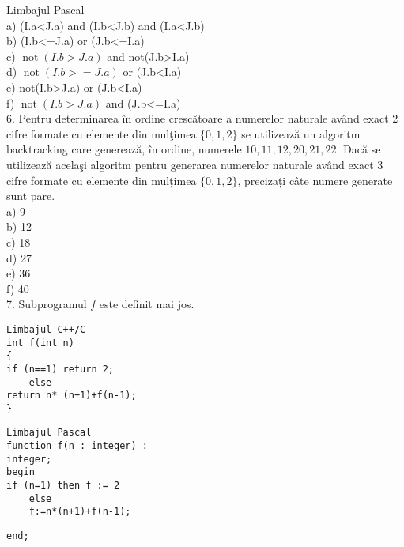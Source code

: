 Limbajul Pascal\\
a) (I.a<J.a) and (I.b<J.b) and (I.a<J.b)\\
b) (I.b<=J.a) or (J.b<=I.a)\\
c) $\operatorname{not}(I . b>J . a)$ and not(J.b>I.a)\\
d) $\operatorname{not}(I . b>=J . a)$ or (J.b<I.a)\\
e) not(I.b>J.a) or (J.b<I.a)\\
f) $\operatorname{not}(I . b>J . a)$ and (J.b<=I.a)\\
6. Pentru determinarea în ordine crescătoare a numerelor naturale având exact 2 cifre formate cu elemente din mulţimea $\{0,1,2\}$ se utilizează un algoritm backtracking care generează, în ordine, numerele $10,11,12,20,21,22$. Dacă se utilizează acelaşi algoritm pentru generarea numerelor naturale având exact 3 cifre formate cu elemente din mulțimea $\{0,1,2\}$, precizați câte numere generate sunt pare.\\
a) 9\\
b) 12\\
c) 18\\
d) 27\\
e) 36\\
f) 40\\
7. Subprogramul $f$ este definit mai jos.

\begin{verbatim}
Limbajul C++/C
int f(int n)
{
if (n==1) return 2;
    else
return n* (n+1)+f(n-1);
}
\end{verbatim}

\begin{verbatim}
Limbajul Pascal
function f(n : integer) :
integer;
begin
if (n=1) then f := 2
    else
    f:=n*(n+1)+f(n-1);
\end{verbatim}

\begin{verbatim}
end;
\end{verbatim}

